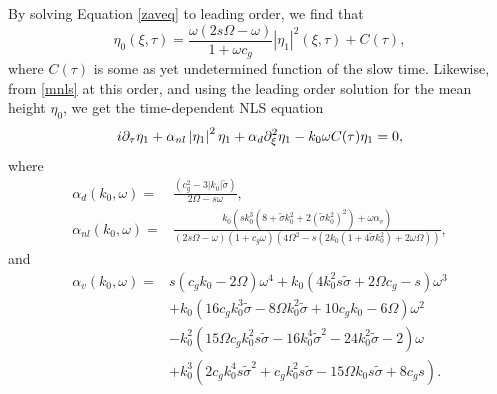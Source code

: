 \documentclass{JFM_Style/jfm}
\begin{document}
By solving Equation \eqref{zaveq} to leading order, we find that  
\begin{equation}
\eta_{0}(\xi,\tau) = \frac{\omega(2s\Omega-\omega)}{1+\omega c_{g}}\left|\eta_{1}\right|^{2}(\xi,\tau) + C(\tau),
\label{zavsol}
\end{equation}
where $C(\tau)$ is some as yet undetermined function of the slow time.  Likewise, from \eqref{mnls} at this order, and using the leading order solution for the mean height $\eta_{0}$, we get the time-dependent NLS equation
\[
i\partial_{\tau}\eta_{1} + \alpha_{nl}\left|\eta_{1}\right|^{2}\eta_{1} + \alpha_{d}\partial_{\xi}^{2}\eta_{1} - k_{0}\omega C(\tau)\eta_{1} = 0,
\]
where
\begin{align*}
\alpha_{d}(k_{0},\omega) = & \frac{(c^2_{g} - 3|k_{0}|\tilde{\sigma})}{2\Omega-s\omega},\\
\alpha_{nl}(k_{0},\omega) = & \frac{k_{0}\left( sk_{0}^{3}\left(8 + \tilde{\sigma}k_{0}^{2} + 2(\tilde{\sigma}k_{0}^{2})^{2}\right) + \omega \alpha_{v}\right)}{\left(2s\Omega -\omega\right)(1+c_{g}\omega)\left(4\Omega^2-s(2k_{0}(1+4\tilde{\sigma}k_{0}^{2})+2\omega\Omega)\right)}, 
\end{align*}
and
\begin{align*}
\alpha_{v}(k_{0},\omega)= & s(c_g k_0  - 2\Omega ) \omega^4 + k_{0}(4 k_{0}^{2} s \tilde{\sigma} + 2 \Omega c_g  -s) \omega^3 \\
& + k_{0}(16 c_g k_{0}^{3} \tilde{\sigma} - 8 \Omega k_{0}^{2} \tilde{\sigma} + 10 c_g k_{0} - 6 \Omega) \omega^2 \\
& -  k_{0}^{2}(15 \Omega c_g k_0^2 s \tilde{\sigma} - 16 k_{0}^{4} \tilde{\sigma}^2 - 24 k_{0}^{2} \tilde{\sigma} - 2 ) \omega \\
& + k_{0}^{3}(2 c_g k_{0}^{4} s \tilde{\sigma}^2 + c_g k_{0}^{2} s \tilde{\sigma} - 15 \Omega k_{0}  s \tilde{\sigma} + 8c_g s).
\end{align*}
\end{document}
